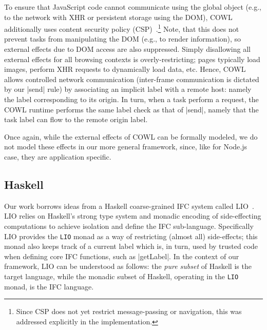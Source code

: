 To ensure that JavaScript code cannot communicate using the global object
(e.g., to the network with XHR or persistent storage using the DOM),
COWL additionally uses content security policy (CSP)~\cite{csp1.1}.\footnote{
  Since CSP does not yet restrict message-passing or navigation, this
  was addressed explicitly in the implementation.
}
%
Note, that this does not prevent tasks from manipulating the DOM
(e.g., to render information), so external effects due to DOM access
are also suppressed.
%
Simply disallowing all external effects for all browsing contexts is
overly-restricting; pages typically load images, perform XHR requests
to dynamically load data,
etc.
%
Hence, COWL allows
controlled network communication (inter-frame communication is
dictated by our |send| rule) by associating an implicit label with a
remote host: namely the label corresponding to its origin.
%
In turn, when a task perform a request, the COWL runtime performs the
same label check as that of |send|, namely that the task label can
flow to
the remote origin label.

Once again, while the external effects of COWL can be formally modeled,
we do not model these effects in our more general framework, since, like
for Node.js case, they are application specific.
%



\subsection{Haskell}
\label{sec:real:hs}
Our work borrows ideas from a Haskell coarse-grained IFC
system called LIO~\cite{lio, stefan:addressing-covert}.
%
LIO relies on Haskell's strong type system and monadic encoding of
side-effecting computations to achieve isolation and define the IFC
sub-language.
%
Specifically LIO provides the \verb|LIO| monad as a way of restricting
(almost all) side-effects; this monad also keeps track of a current
label which is, in turn, used by trusted code when defining core IFC
functions, such as |getLabel|.
%
In the context of our framework, LIO can be understood as follows: the
\emph{pure subset} of Haskell is the target language, while the
monadic subset of Haskell, operating in the \verb|LIO| monad, is the
IFC language.

